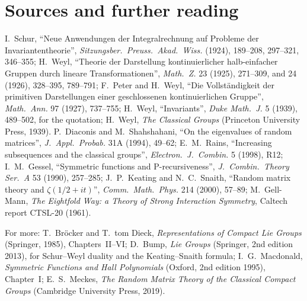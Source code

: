 \section*{Sources and further reading}

I.~Schur, ``Neue Anwendungen der Integralrechnung auf Probleme der Invariantentheorie'', \emph{Sitzungsber.\ Preuss.\ Akad.\ Wiss.} (1924), 189--208, 297--321, 346--355; H.~Weyl, ``Theorie der Darstellung kontinuierlicher halb-einfacher Gruppen durch lineare
Transformationen'', \emph{Math.\ Z.} 23 (1925), 271--309, and 24 (1926), 328--395, 789--791; F.~Peter and H.~Weyl, ``Die Vollständigkeit der primitiven Darstellungen einer geschlossenen kontinuierlichen Gruppe'', \emph{Math.\ Ann.} 97 (1927), 737--755;
H.~Weyl, ``Invariants'', \emph{Duke Math.\ J.} 5 (1939), 489--502, for the quotation; H.~Weyl, \emph{The Classical Groups} (Princeton University Press, 1939). P.~Diaconis and M.~Shahshahani, ``On the eigenvalues of random matrices'', \emph{J.\ Appl.\ Probab.} 31A (1994), 49--62;
E.~M.~Rains, ``Increasing subsequences and the classical groups'', \emph{Electron.\ J.\ Combin.} 5 (1998), R12; I.~M.~Gessel, ``Symmetric functions and P-recursiveness'', \emph{J.\ Combin.\ Theory Ser.\ A} 53 (1990), 257--285; J.~P.~Keating and N.~C.~Snaith, ``Random matrix
theory and $\zeta(1/2+it)$'', \emph{Comm.\ Math.\ Phys.} 214 (2000), 57--89; M.~Gell-Mann, \emph{The Eightfold Way: a Theory of Strong Interaction Symmetry}, Caltech report CTSL-20 (1961).

For more: T.~Bröcker and T.~tom Dieck, \emph{Representations of Compact Lie Groups} (Springer, 1985), Chapters~II--VI; D.~Bump, \emph{Lie Groups} (Springer, 2nd edition 2013), for Schur--Weyl duality and the Keating--Snaith formula; I.~G.~Macdonald, \emph{Symmetric Functions and
Hall Polynomials} (Oxford, 2nd edition 1995), Chapter~I; E.~S.~Meckes, \emph{The Random Matrix Theory of the Classical Compact Groups} (Cambridge University Press, 2019).
